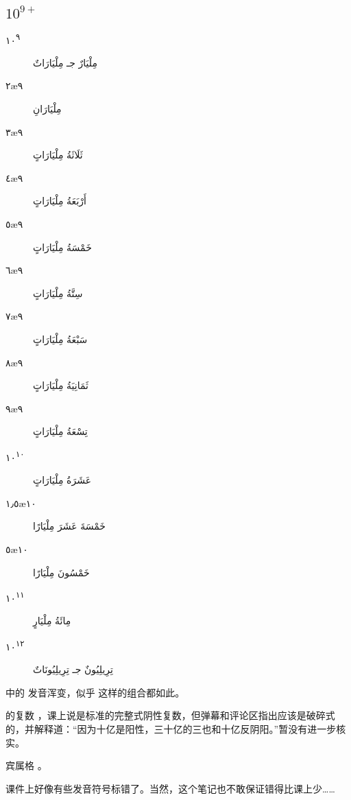 \subsection{$10^{9+}$}

\begin{Arabic}
    \begin{multicols}{2}
        \begin{description}
            \item[١٠\textsuperscript{٩}] مِلْيَارٌ جـ مِلْيَارَاتٌ
            \item[٢\ae{٩}] مِلْيَارَانِ
            \item[٣\ae{٩}] ثَلَاثَةُ مِلْيَارَاتٍ
            \item[٤\ae{٩}] أَرْبَعَةُ مِلْيَارَاتٍ
            \item[٥\ae{٩}] خَمْسَةُ مِلْيَارَاتٍ
            \item[٦\ae{٩}] سِتَّةُ مِلْيَارَاتٍ
            \item[٧\ae{٩}] سَبْعَةُ مِلْيَارَاتٍ
            \item[٨\ae{٩}] ثَمَانِيَةُ مِلْيَارَاتٍ
            \item[٩\ae{٩}] تِسْعَةُ مِلْيَارَاتٍ
            \item[١٠\textsuperscript{١٠}] عَشَرَةُ مِلْيَارَاتٍ
            \item[١٫٥\ae{١٠}] خَمْسَةَ عَشَرَ مِلْيَارًا
            \item[٥\ae{١٠}] خَمْسُونَ مِلْيَارًا
            \item[١٠\textsuperscript{١١}] مِائَةُ مِلْيَارٍ
            \item[١٠\textsuperscript{١٢}] تِرِيلِيُونٌ جـ تِرِيلِيُونَاتٌ
        \end{description}
    \end{multicols}
\end{Arabic}

\begin{attention}
     中的  发音浑变，似乎  这样的组合都如此。

     的复数  ，课上说是标准的完整式阴性复数，但弹幕和评论区指出应该是破碎式的，并解释道：``因为十亿是阳性，三十亿的三也和十亿反阴阳。''暂没有进一步核实。

     宾属格  。
\end{attention}

\begin{note}
    课件上好像有些发音符号标错了。当然，这个笔记也不敢保证错得比课上少……
\end{note}


            
